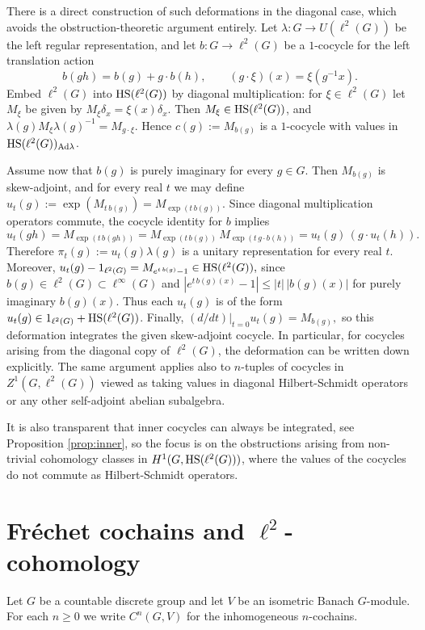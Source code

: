 \documentclass[12pt]{amsproc}
\theoremstyle{plain}
\theoremstyle{definition}
\numberwithin{equation}{section}
\newcommand{\HS}{{\rm HS}}
\begin{document}
\medskip

There is a direct construction of such deformations in the diagonal case, which
avoids the obstruction-theoretic argument entirely.
Let $\lambda\colon G\to U(\ell^2(G))$ be the left regular representation,
and let
$
b\colon G\to \ell^2(G)
$
be a $1$-cocycle for the left translation action
\[
b(gh)=b(g)+g\cdot b(h),
\qquad
(g\cdot \xi)(x)=\xi(g^{-1}x).
\]
Embed $\ell^2(G)$ into $\HS(\ell^2(G))$ by diagonal multiplication:
for $\xi\in \ell^2(G)$ let $M_\xi$ be given by
$
M_\xi \delta_x=\xi(x)\delta_x.
$
Then $M_\xi\in \HS(\ell^2(G))$, and
$
\lambda(g)M_\xi\lambda(g)^{-1}=M_{g\cdot \xi}.
$
Hence
$
c(g):=M_{b(g)}
$
is a $1$-cocycle with values in $\HS(\ell^2(G))_{\mathrm{Ad}\lambda}$.

Assume now that $b(g)$ is purely imaginary for every $g\in G$. Then
$M_{b(g)}$ is skew-adjoint, and for every real $t$ we may define
$
u_t(g):=\exp(M_{t\,b(g)})=M_{\exp(t\,b(g))}.
$
Since diagonal multiplication operators commute, the cocycle identity for $b$
implies
\[
u_t(gh)
=
M_{\exp(t\,b(gh))}
=
M_{\exp(t\,b(g))}\,M_{\exp(t\,g\cdot b(h))}
=
u_t(g)\,(g\cdot u_t(h)).
\]
Therefore
$
\pi_t(g):=u_t(g)\lambda(g)
$
is a unitary representation for every real $t$.
Moreover,
$
u_t(g)-1_{\ell^2(G)}=M_{e^{t\,b(g)}-1}\in \HS(\ell^2(G)),
$
since $b(g)\in \ell^2(G)\subset \ell^\infty(G)$ and
$
|e^{t\,b(g)(x)}-1|\le |t|\,|b(g)(x)|
$
for purely imaginary $b(g)(x)$. Thus each $u_t(g)$ is of the form
$
u_t(g) \in 1_{\ell^2(G)}+ \HS(\ell^2(G))$.
Finally,
$
(d/dt)|_{t=0}u_t(g)=M_{b(g)},
$
so this deformation integrates the given skew-adjoint cocycle.
In particular, for cocycles arising from the diagonal copy of
$\ell^2(G)$, the deformation can be written down explicitly. The same argument applies also to $n$-tuples of cocycles in $Z^1(G,\ell^2(G))$ viewed as taking values in diagonal Hilbert-Schmidt operators or any other self-adjoint abelian subalgebra.

It is also transparent that inner cocycles can always be integrated, see Proposition \ref{prop:inner}, so the focus is on the obstructions arising from non-trivial cohomology classes in $H^1(G,\HS(\ell^2(G)))$, where the values of the  cocycles do not commute as Hilbert-Schmidt operators.

\section{Fr\'echet cochains and \texorpdfstring{$\ell^2$}{ell2}-cohomology}
\label{sec:frechet}
Let $G$ be a countable discrete group and let $V$ be an isometric Banach $G$-module. For each $n\ge 0$ we write $C^n(G,V)$ for the inhomogeneous $n$-cochains.
\end{document}

